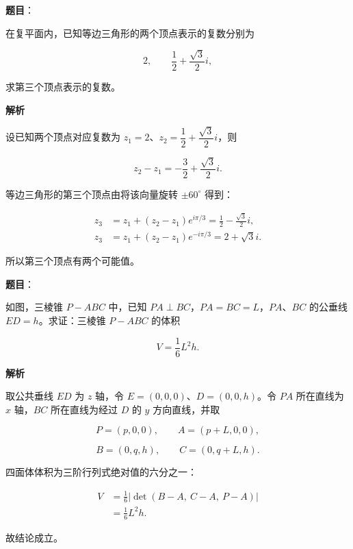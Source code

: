 \begin{answer}

\textbf{题目}：

在复平面内，已知等边三角形的两个顶点表示的复数分别为

\nopagebreak[4]
\[
2,\qquad \frac12+\frac{\sqrt3}{2}i,
\]

求第三个顶点表示的复数。

\textbf{解析}

设已知两个顶点对应复数为 $z_1=2$、$z_2=\dfrac12+\dfrac{\sqrt3}{2}i$，则

\nopagebreak[4]
\[
z_2-z_1=-\frac32+\frac{\sqrt3}{2}i.
\]

等边三角形的第三个顶点由将该向量旋转 $\pm60^\circ$ 得到：

\nopagebreak[4]
\[
\begin{aligned}
z_3&=z_1+(z_2-z_1)e^{i\pi/3}
=\frac12-\frac{\sqrt3}{2}i,\\
z_3&=z_1+(z_2-z_1)e^{-i\pi/3}
=2+\sqrt3i.
\end{aligned}
\]

所以第三个顶点有两个可能值。


\end{answer}
\begin{answer}

\textbf{题目}：

如图，三棱锥 $P-ABC$ 中，已知 $PA\perp BC$，$PA=BC=L$，$PA\text{、}BC$ 的公垂线 $ED=h$。求证：三棱锥 $P-ABC$ 的体积

\nopagebreak[4]
\[
V=\frac16L^2h.
\]
\nopagebreak[4]
\begin{center}\end{center}
\nopagebreak[4]
\textbf{解析}

取公共垂线 $ED$ 为 $z$ 轴，令 $E=(0,0,0)$、$D=(0,0,h)$。令 $PA$ 所在直线为 $x$ 轴，$BC$ 所在直线为经过 $D$ 的 $y$ 方向直线，并取

\nopagebreak[4]
\[
P=(p,0,0),\qquad A=(p+L,0,0),
\]

\nopagebreak[4]
\[
B=(0,q,h),\qquad C=(0,q+L,h).
\]

四面体体积为三阶行列式绝对值的六分之一：

\nopagebreak[4]
\[
\begin{aligned}
V
&=\frac16\left|\det(B-A,\ C-A,\ P-A)\right|\\
&=\frac16L^2h.
\end{aligned}
\]

故结论成立。


\end{answer}
